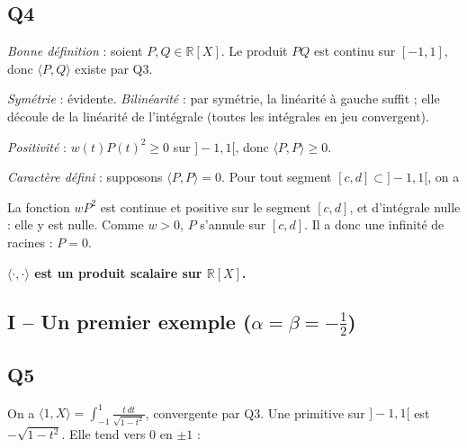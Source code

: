 \documentclass[11pt,a4paper]{article}
\newcommand{\equationajustee}[1]{%
  \sbox{\boiteequation}{$\displaystyle #1$}%
  \ifdim\wd\boiteequation>\linewidth
    \[\resizebox{\linewidth}{!}{\usebox{\boiteequation}}\]%
  \else
    \[#1\]%
  \fi}
\begin{document}
\hypertarget{q4}{%
\subsection{Q4}\label{q4}}

\emph{Bonne définition} : soient \(P,Q\in\mathbb R[X]\). Le produit \(PQ\) est continu sur \([-1,1]\), donc \(\langle P,Q\rangle\) existe par Q3.

\emph{Symétrie} : évidente. \emph{Bilinéarité} : par symétrie, la linéarité à gauche suffit ; elle découle de la linéarité de l'intégrale (toutes les intégrales en jeu convergent).

\emph{Positivité} : \(w(t)P(t)^2\geqslant0\) sur \(]-1,1[\), donc \(\langle P,P\rangle\geqslant0\).

\emph{Caractère défini} : supposons \(\langle P,P\rangle=0\). Pour tout segment \([c,d]\subset]-1,1[\), on a

\equationajustee{\begin{aligned}0&\leqslant\int_c^d wP^2\\&\leqslant\int_{-1}^1wP^2\\&=0.\end{aligned}}

La fonction \(wP^2\) est continue et positive sur le segment \([c,d]\), et d'intégrale nulle : elle y est nulle. Comme \(w>0\), \(P\) s'annule sur \([c,d]\). Il a donc une infinité de racines : \(P=0\).

\textbf{\(\langle\cdot,\cdot\rangle\) est un produit scalaire sur \(\mathbb R[X]\).}

\hypertarget{i-un-premier-exemple-alphabeta-tfrac12}{%
\subsection{\texorpdfstring{I -- Un premier exemple (\(\alpha=\beta=-\tfrac12\))}{I -- Un premier exemple (\textbackslash alpha=\textbackslash beta=-\textbackslash tfrac12)}}\label{i-un-premier-exemple-alphabeta-tfrac12}}

\hypertarget{q5}{%
\subsection{Q5}\label{q5}}

On a \(\langle1,\allowbreak X\rangle=\displaystyle\int_{-1}^1\frac{t\,dt}{\sqrt{1-t^2}}\), convergente par Q3. Une primitive sur \(]-1,1[\) est \(-\sqrt{1-t^2}\). Elle tend vers \(0\) en \(\pm1\) :

\equationajustee{\boxed{\langle1,X\rangle=0.}}
\end{document}
